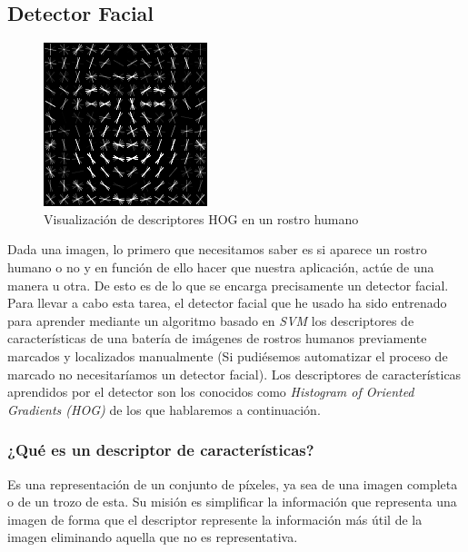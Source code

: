\documentclass[a4paper,11pt]{book}
\begin{document}
\subsection{Detector Facial}\label{sub:detectorFacial}
\begin{figure}[t]
	\centering
	\includegraphics[width=0.3\linewidth]{imagenes/hog01}
	\caption[Descriptores HOG]{Visualización de descriptores HOG en un rostro humano \cite{king14}}
	\label{fig:hog01}
\end{figure}
Dada una imagen, lo primero que necesitamos saber es si aparece un rostro humano o no y en función de ello hacer que nuestra aplicación, actúe de una manera u otra. De esto es de lo que se encarga precisamente un detector facial.\\
Para llevar a cabo esta tarea, el detector facial que he usado ha sido entrenado para aprender mediante un algoritmo basado en \textit{SVM}\cite{cortes_vapnik95} los descriptores de características de una batería de imágenes de rostros humanos previamente marcados y localizados manualmente (Si pudiésemos automatizar el proceso de marcado no necesitaríamos un detector facial). Los descriptores de características aprendidos por el detector son los conocidos como \textit{Histogram of Oriented Gradients (HOG)}\cite{dalal_triggs05} de los que hablaremos a continuación.
\subsubsection{¿Qué es un descriptor de características?}
Es una representación de un conjunto de píxeles, ya sea de una imagen completa o de un trozo de esta. Su misión es simplificar la información que representa una imagen de forma que el descriptor represente la información más útil de la imagen eliminando aquella que no es representativa. 
\end{document}
